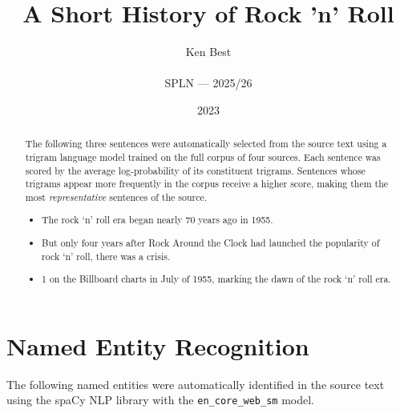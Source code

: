 \documentclass[12pt,a4paper]{article}
\title{\textbf{A Short History of Rock 'n' Roll}}
\author{Ken Best \\\\
\small SPLN --- 2025/26}
\date{2023}
\begin{document}
\maketitle

\begin{abstract}
The following three sentences were automatically selected from the source text
using a trigram language model trained on the full corpus of four sources.
Each sentence was scored by the average log-probability of its constituent
trigrams. Sentences whose trigrams appear more frequently in the corpus
receive a higher score, making them the most \emph{representative} sentences
of the source.

\begin{itemize}
  \item The rock `n' roll era began nearly 70 years ago in 1955.
  \item But only four years after Rock Around the Clock had launched the popularity of rock `n' roll, there was a crisis.
  \item 1 on the Billboard charts in July of 1955, marking the dawn of the rock `n' roll era.
\end{itemize}
\end{abstract}

\section{Named Entity Recognition}

The following named entities were automatically identified in the source
text using the spaCy NLP library with the \texttt{en\_core\_web\_sm} model.
\end{document}
